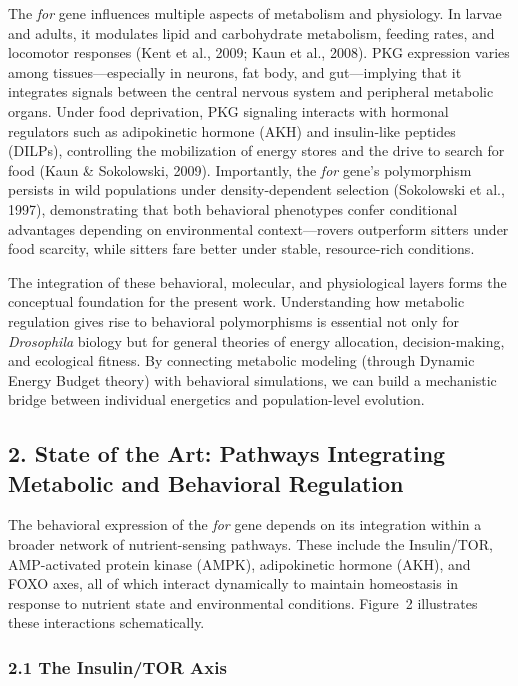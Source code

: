\documentclass[11pt]{article}
\begin{document}
The \emph{for} gene influences multiple aspects of metabolism and physiology. In larvae and adults, it modulates lipid and carbohydrate metabolism, feeding rates, and locomotor responses (Kent et al., 2009; Kaun et al., 2008). PKG expression varies among tissues---especially in neurons, fat body, and gut---implying that it integrates signals between the central nervous system and peripheral metabolic organs. Under food deprivation, PKG signaling interacts with hormonal regulators such as adipokinetic hormone (AKH) and insulin-like peptides (DILPs), controlling the mobilization of energy stores and the drive to search for food (Kaun \& Sokolowski, 2009). Importantly, the \emph{for} gene's polymorphism persists in wild populations under density-dependent selection (Sokolowski et al., 1997), demonstrating that both behavioral phenotypes confer conditional advantages depending on environmental context---rovers outperform sitters under food scarcity, while sitters fare better under stable, resource-rich conditions.

The integration of these behavioral, molecular, and physiological layers forms the conceptual foundation for the present work. Understanding how metabolic regulation gives rise to behavioral polymorphisms is essential not only for \emph{Drosophila} biology but for general theories of energy allocation, decision-making, and ecological fitness. By connecting metabolic modeling (through Dynamic Energy Budget theory) with behavioral simulations, we can build a mechanistic bridge between individual energetics and population-level evolution.

\subsection*{2. State of the Art: Pathways Integrating Metabolic and Behavioral Regulation}

The behavioral expression of the \emph{for} gene depends on its integration within a broader network of nutrient-sensing pathways. These include the Insulin/TOR, AMP-activated protein kinase (AMPK), adipokinetic hormone (AKH), and FOXO axes, all of which interact dynamically to maintain homeostasis in response to nutrient state and environmental conditions. Figure~2 illustrates these interactions schematically.

\subsubsection*{2.1 The Insulin/TOR Axis}
\end{document}
